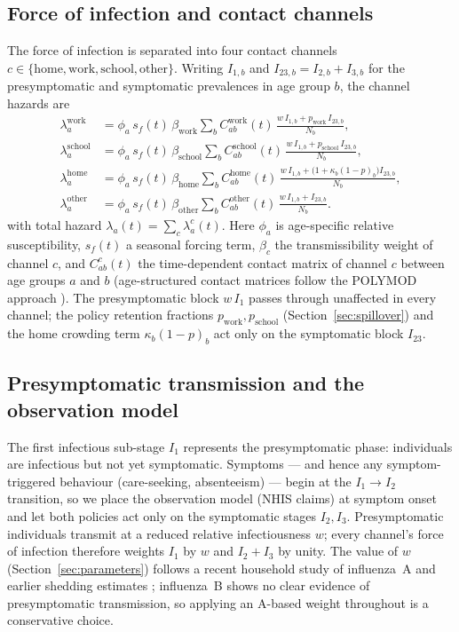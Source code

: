 \documentclass[12pt]{article}
\theoremstyle{plain}
\theoremstyle{remark}
\theoremstyle{definition}
\begin{document}
\subsection{Force of infection and contact channels}
\label{sec:foi}
The force of infection is separated into four contact channels $c \in \{\mathrm{home},\mathrm{work},\mathrm{school},\mathrm{other}\}$. Writing $I_{1,b}$ and $I_{23,b} = I_{2,b} + I_{3,b}$ for the presymptomatic and symptomatic prevalences in age group $b$, the channel hazards are
\begin{align}
\lambda^{\mathrm{work}}_a   &= \phi_a\, s_f(t)\, \beta_{\mathrm{work}} \sum_b C^{\mathrm{work}}_{ab}(t)\, \frac{w\,I_{1,b} + p_{\mathrm{work}}\, I_{23,b}}{N_b}, \\
\lambda^{\mathrm{school}}_a &= \phi_a\, s_f(t)\, \beta_{\mathrm{school}} \sum_b C^{\mathrm{school}}_{ab}(t)\, \frac{w\,I_{1,b} + p_{\mathrm{school}}\, I_{23,b}}{N_b}, \\
\lambda^{\mathrm{home}}_a   &= \phi_a\, s_f(t)\, \beta_{\mathrm{home}} \sum_b C^{\mathrm{home}}_{ab}(t)\, \frac{w\,I_{1,b} + \bigl(1 + \kappa_b (1-p)_b\bigr) I_{23,b}}{N_b}, \\
\lambda^{\mathrm{other}}_a  &= \phi_a\, s_f(t)\, \beta_{\mathrm{other}} \sum_b C^{\mathrm{other}}_{ab}(t)\, \frac{w\,I_{1,b} + I_{23,b}}{N_b}.
\end{align}
with total hazard $\lambda_a(t) = \sum_c \lambda^c_a(t)$. Here $\phi_a$ is age-specific relative susceptibility, $s_f(t)$ a seasonal forcing term, $\beta_c$ the transmissibility weight of channel $c$, and $C^{c}_{ab}(t)$ the time-dependent contact matrix of channel $c$ between age groups $a$ and $b$ (age-structured contact matrices follow the POLYMOD approach \cite{Mossong2008}). The presymptomatic block $w\,I_1$ passes through unaffected in every channel; the policy retention fractions $p_{\mathrm{work}}, p_{\mathrm{school}}$ (Section~\ref{sec:spillover}) and the home crowding term $\kappa_b (1-p)_b$ act only on the symptomatic block $I_{23}$.

\subsection{Presymptomatic transmission and the observation model}
\label{sec:presymp}
The first infectious sub-stage $I_1$ represents the presymptomatic phase: individuals are infectious but not yet symptomatic. Symptoms --- and hence any symptom-triggered behaviour (care-seeking, absenteeism) --- begin at the $I_1 \to I_2$ transition, so we place the observation model (NHIS claims) at symptom onset and let both policies act only on the symptomatic stages $I_2, I_3$. Presymptomatic individuals transmit at a reduced relative infectiousness $w$; every channel's force of infection therefore weights $I_1$ by $w$ and $I_2 + I_3$ by unity. The value of $w$ (Section~\ref{sec:parameters}) follows a recent household study of influenza~A \cite{NatureHealth2026} and earlier shedding estimates \cite{Lau2010}; influenza~B shows no clear evidence of presymptomatic transmission, so applying an A-based weight throughout is a conservative choice.
\end{document}
